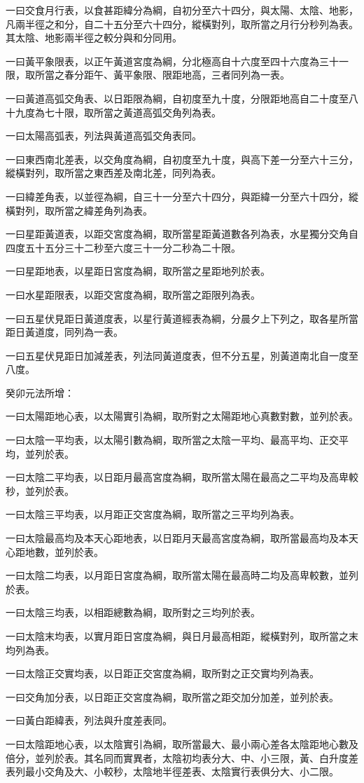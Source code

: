 \begin{pinyinscope}
一曰交食月行表，以食甚距緯分為綱，自初分至六十四分，與太陽、太陰、地影，凡兩半徑之和分，自二十五分至六十四分，縱橫對列，取所當之月行分秒列為表。其太陰、地影兩半徑之較分與和分同用。

一曰黃平象限表，以正午黃道宮度為綱，分北極高自十六度至四十六度為三十一限，取所當之春分距午、黃平象限、限距地高，三者同列為一表。

一曰黃道高弧交角表、以日距限為綱，自初度至九十度，分限距地高自二十度至八十九度為七十限，取所當之黃道高弧交角列為表。

一曰太陽高弧表，列法與黃道高弧交角表同。

一曰東西南北差表，以交角度為綱，自初度至九十度，與高下差一分至六十三分，縱橫對列，取所當之東西差及南北差，同列為表。

一曰緯差角表，以並徑為綱，自三十一分至六十四分，與距緯一分至六十四分，縱橫對列，取所當之緯差角列為表。

一曰星距黃道表，以距交宮度為綱，取所當星距黃道數各列為表，水星獨分交角自四度五十五分三十二秒至六度三十一分二秒為二十限。

一曰星距地表，以星距日宮度為綱，取所當之星距地列於表。

一曰水星距限表，以距交宮度為綱，取所當之距限列為表。

一曰五星伏見距日黃道度表，以星行黃道經表為綱，分晨夕上下列之，取各星所當距日黃道度，同列為一表。

一曰五星伏見距日加減差表，列法同黃道度表，但不分五星，別黃道南北自一度至八度。

癸卯元法所增：

一曰太陽距地心表，以太陽實引為綱，取所對之太陽距地心真數對數，並列於表。

一曰太陰一平均表，以太陽引數為綱，取所當之太陰一平均、最高平均、正交平均，並列於表。

一曰太陰二平均表，以日距月最高宮度為綱，取所當太陽在最高之二平均及高卑較秒，並列於表。

一曰太陰三平均表，以月距正交宮度為綱，取所當之三平均列為表。

一曰太陰最高均及本天心距地表，以日距月天最高宮度為綱，取所當最高均及本天心距地數，並列於表。

一曰太陰二均表，以月距日宮度為綱，取所當太陽在最高時二均及高卑較數，並列於表。

一曰太陰三均表，以相距總數為綱，取所對之三均列於表。

一曰太陰末均表，以實月距日宮度為綱，與日月最高相距，縱橫對列，取所當之末均列為表。

一曰太陰正交實均表，以日距正交宮度為綱，取所對之正交實均列為表。

一曰交角加分表，以日距正交宮度為綱，取所當之距交加分加差，並列於表。

一曰黃白距緯表，列法與升度差表同。

一曰太陰距地心表，以太陰實引為綱，取所當最大、最小兩心差各太陰距地心數及倍分，並列於表。其名同而實異者，太陰初均表分大、中、小三限，黃、白升度差表列最小交角及大、小較秒，太陰地半徑差表、太陰實行表俱分大、小二限。


\end{pinyinscope}